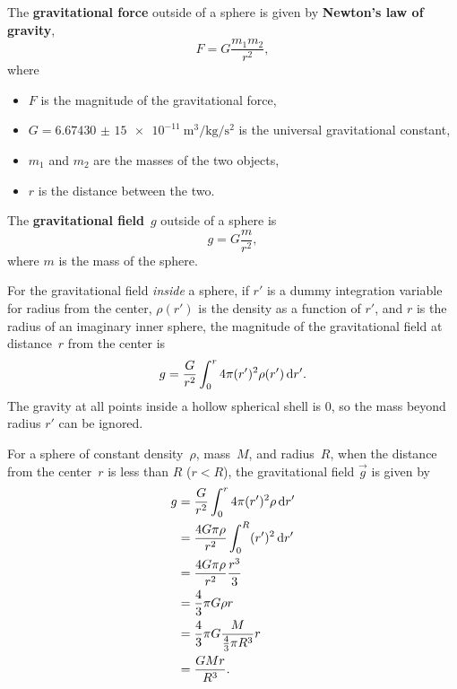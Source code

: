 The \textbf{gravitational force} outside of a sphere is given by
\textbf{Newton's law of gravity},
\begin{equation} \label{eq:newtons-law-of-gravity}
    F = G \frac{m_1 m_2}{r^2},
\end{equation}
where
\begin{itemize}
    \item \(F\) is the magnitude of the gravitational force,
    \item \(G = \qty{6.674 30(15)e-11}{\metre\cubed \per \kilogram \per
        \second\squared}\)
        is the universal gravitational constant, \autocite{nist-G}
    \item \(m_1\) and \(m_2\) are the masses of the two objects,
    \item \(r\) is the distance between the two.
\end{itemize}

The \textbf{gravitational field}~\(g\) outside of a sphere is
\begin{equation}
    g = G \frac{m}{r^2},
\end{equation}
where \(m\) is the mass of the sphere.

For the gravitational field \emph{inside} a sphere,
if \(r'\) is a dummy integration variable for radius from the center,
\(\rho(r')\) is the density as a function of \(r'\),
and \(r\) is the radius of an imaginary inner sphere,
the magnitude of the gravitational field at distance~\(r\)
from the center is
\begin{equation}
    g = \frac{G}{r^2}
    \int_{0}^{r} 4\pi (r')^2 \rho(r') \odif{r'}.
\end{equation}
The gravity at all points inside a hollow spherical shell is 0,
so the mass beyond radius \(r'\) can be ignored.

For a sphere of constant density~\(\rho\), mass~\(M\),
and radius~\(R\),
when the distance from the center~\(r\) is less than \(R\) (\(r < R\)),
the gravitational field \(\vec{g}\) is given by
\begin{equation}
    \begin{aligned}
        g &= \frac{G}{r^2} \int_{0}^{r} 4\pi
        (r')^2 \rho \odif{r'} \\
        &= \frac{4 G \pi \rho}{r^2}
        \int_{0}^{R} (r')^2 \odif{r'} \\
        &= \frac{4 G \pi \rho}{r^2} \frac{r^3}{3} \\
        &= \frac{4}{3} \pi G \rho r \\
        &= \frac{4}{3} \pi G \frac{M}{\frac{4}{3} \pi R^3} r \\
        &= \frac{G M r}{R^3}.
    \end{aligned}
\end{equation}

